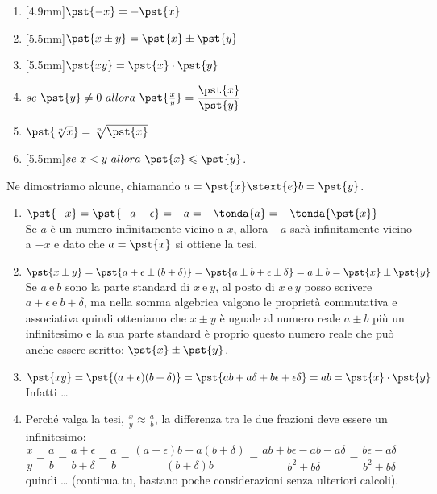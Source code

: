 \begin{multicols}{2}
\begin{enumerate} [nosep]
 \item \raisebox{+0mm}[4.9mm]{}\(\pst{-x} = -\pst{x}\)
 \item \raisebox{+0mm}[5.5mm]{}\(\pst{x \pm y} = \pst{x} \pm \pst{y}\)
 \item \raisebox{+0mm}[5.5mm]{}\(\pst{xy} = \pst{x} \cdot \pst{y}\)
 \item \(se ~ \pst{y} \neq 0 ~ allora ~
 \pst{\frac{x}{y}} = \dfrac{\pst{x}}{\pst{y}}\)
 \item \(\pst{\sqrt[n]{x}} = \sqrt[n]{\pst{x}}\)
 \item \raisebox{+0mm}[5.5mm]{}\(se ~  x < y ~ allora ~ 
 \pst{x} \leqslant \pst{y}\).
\end{enumerate}
\end{multicols}

Ne dimostriamo alcune, chiamando \quad  \(a=\pst{x} \stext{ e } b=\pst{y}\).
\begin{enumerate}%
 \item \(\pst{-x}=\pst{-a -\epsilon}=-a=-\tonda{a}=-\tonda{\pst{x}}\)\\
Se \(a\) è un numero infinitamente vicino a \(x\), allora \(-a\) sarà 
infinitamente vicino a \(-x\) e dato che \(a=\pst{x}\) si ottiene la tesi.
 \item \(\pst{x \pm y} = \pst{a+\epsilon \pm (b+\delta)}= 
         \pst{a\pm b+\epsilon \pm \delta}= a\pm b = \pst{x}\pm\pst{y}\)\\
Se \(a ~ \text{e} ~ b\) sono la parte standard di \(x ~ \text{e} ~ y\),
al posto di \(x ~ \text{e} ~ y\) posso scrivere 
\(a+\epsilon ~ \text{e} ~ b+\delta\), ma nella somma algebrica valgono le 
proprietà commutativa e associativa quindi otteniamo che \(x \pm y\) è 
uguale al numero reale \(a \pm b\) più un infinitesimo e la sua parte 
standard è proprio questo numero reale che può anche essere scritto:
\(\pst{x}\pm\pst{y}\).
 \item\(\pst{xy} = \pst{(a+\epsilon)(b+\delta)}=
        \pst{ab+a\delta+b\epsilon+\epsilon\delta}=ab=
        \pst{x} \cdot \pst{y}\) \\
Infatti \dots
 \item Perché valga la tesi, \(\frac{x}{y} \approx \frac{a}{b}\), la 
differenza tra le due frazioni deve essere un infinitesimo:\\
\(\dfrac{x}{y}- \dfrac{a}{b}=\dfrac{a+\epsilon}{b+\delta}-\dfrac{a}{b}=
  \dfrac{(a+\epsilon)b-a(b+\delta)}{(b+\delta)b}=
  \dfrac{ab+b\epsilon-ab-a\delta}{b^2+b\delta}=
  \dfrac{b\epsilon-a\delta}{b^2+b\delta}\)\\ quindi \dots
(continua tu, bastano poche considerazioni senza ulteriori calcoli).
\end{enumerate}

